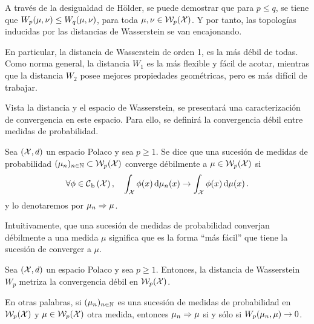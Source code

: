 {{	  \begin{remark}
		  A través de la desigualdad de Hölder, se puede demostrar que para $p \leq q$, se tiene que $\Wasserstein[p]{\mu}{\nu} \leq \Wasserstein[q]{\mu}{\nu}$, para toda $\mu, \nu \in \WassersteinSpace[p]{\cX}$. Y por tanto, las topologías inducidas por las distancias de Wasserstein se van encajonando.

		  En particular, la distancia de Wasserstein de orden 1, es la más débil de todas. Como norma general, la distancia $W_1$  es la más flexible y fácil de acotar, mientras que la distancia $W_2$ posee mejores propiedades geométricas, pero es más difícil de trabajar.
	  \end{remark}

	  Vista la distancia y el espacio de Wasserstein, se presentará una caracterización de convergencia en este espacio. Para ello, se definirá la convergencia débil entre medidas de probabilidad.

	  \begin{definition}
		  Sea $(\cX, d)$ un espacio Polaco y sea $p \geq 1$. Se dice que una sucesión de medidas de probabilidad $(\mu_n)_{n \in \N} \subset \WassersteinSpace[p]{\cX} $ converge débilmente a $\mu \in \WassersteinSpace[p]{\cX}$ si
		  \begin{equation}
			  \forall \phi \in \ContBoundedSpace[\cX], \quad \int_{\cX} \phi(x) \dd{\mu_n(x)} \to \int_{\cX} \phi(x) \dmu[x].
		  \end{equation}
		  y lo denotaremos por $\mu_n \wto \mu$.
	  \end{definition}

	  \begin{note}
		  Intuitivamente, que una sucesión de medidas de probabilidad converjan débilmente a una medida $\mu$ significa que es la forma ``más fácil'' que tiene la sucesión de converger a $\mu$.
	  \end{note}

	  \begin{theorem}
		  Sea $(\cX, d)$ un espacio Polaco y sea $p \geq 1$. Entonces, la distancia de Wasserstein $W_p$  metriza la convergencia débil en $\WassersteinSpace[p]{\cX}$.
	  \end{theorem}

	  \begin{remark}
		  En otras palabras, si $(\mu_n)_{n\in\N}$ es una sucesión de medidas de probabilidad en $\WassersteinSpace[p]{\cX}$ y $\mu\in \WassersteinSpace[p]{\cX} $ otra medida, entonces $\mu_n \wto \mu$ si y sólo si $\Wasserstein[p]{\mu_n}{\mu} \to 0$.
	  \end{remark}

}}
